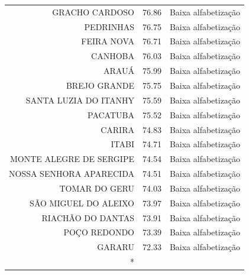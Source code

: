 \begin{longtable}[t]{rlr}
GRACHO CARDOSO & 76.86 & Baixa alfabetização\\
PEDRINHAS & 76.75 & Baixa alfabetização\\
\addlinespace
FEIRA NOVA & 76.71 & Baixa alfabetização\\
CANHOBA & 76.03 & Baixa alfabetização\\
ARAUÁ & 75.99 & Baixa alfabetização\\
BREJO GRANDE & 75.75 & Baixa alfabetização\\
SANTA LUZIA DO ITANHY & 75.59 & Baixa alfabetização\\
\addlinespace
PACATUBA & 75.52 & Baixa alfabetização\\
CARIRA & 74.83 & Baixa alfabetização\\
ITABI & 74.71 & Baixa alfabetização\\
MONTE ALEGRE DE SERGIPE & 74.54 & Baixa alfabetização\\
NOSSA SENHORA APARECIDA & 74.51 & Baixa alfabetização\\
\addlinespace
TOMAR DO GERU & 74.03 & Baixa alfabetização\\
SÃO MIGUEL DO ALEIXO & 73.97 & Baixa alfabetização\\
RIACHÃO DO DANTAS & 73.91 & Baixa alfabetização\\
POÇO REDONDO & 73.39 & Baixa alfabetização\\
GARARU & 72.33 & Baixa alfabetização\\*
\end{longtable}
\endgroup{}